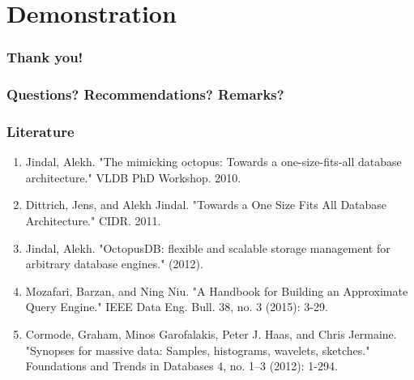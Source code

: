 \documentclass{beamer}
\begin{document}
\section{Demonstration}

\begin{frame}
\frametitle{Thank you!}
\end{frame}

\begin{frame}
 \frametitle{Questions? Recommendations? Remarks?}
\end{frame}

\begin{frame}
\frametitle{Literature}
\begin{enumerate}
\item{Jindal, Alekh. "The mimicking octopus: Towards a one-size-fits-all database architecture." VLDB PhD Workshop. 2010.}
\item{Dittrich, Jens, and Alekh Jindal. "Towards a One Size Fits All Database Architecture." CIDR. 2011.}
\item{Jindal, Alekh. "OctopusDB: flexible and scalable storage management for arbitrary database engines." (2012).}
\item{Mozafari, Barzan, and Ning Niu. "A Handbook for Building an Approximate Query Engine." IEEE Data Eng. Bull. 38, no. 3 (2015): 3-29.}
\item{Cormode, Graham, Minos Garofalakis, Peter J. Haas, and Chris Jermaine. "Synopses for massive data: Samples, histograms, wavelets, sketches." Foundations and Trends in Databases 4, no. 1–3 (2012): 1-294.}
\end{enumerate}
\end{frame}
\end{document}
